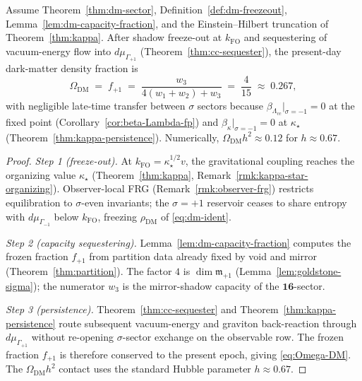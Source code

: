 \begin{theorem}
\label{thm:dm-abundance}
Assume Theorem~\ref{thm:dm-sector}, Definition~\ref{def:dm-freezeout},
Lemma~\ref{lem:dm-capacity-fraction}, and the Einstein--Hilbert truncation of
Theorem~\ref{thm:kappa}. After shadow freeze-out at $k_{\mathrm{FO}}$ and
sequestering of vacuum-energy flow into $d\mu_{\Gamma_{+1}}$
(Theorem~\ref{thm:cc-sequester}), the present-day dark-matter density fraction
is
\begin{equation}\label{eq:Omega-DM}
  \Omega_{\mathrm{DM}}
  \;=\;
  f_{+1}
  \;=\;
  \frac{w_3}{4(w_1+w_2)+w_3}
  \;=\;
  \frac{4}{15}
  \;\approx\;
  0.267,
\end{equation}
with negligible late-time transfer between $\sigma$ sectors because
$\beta_{\Lambda_{\mathrm{cc}}}|_{\sigma=-1}=0$ at the fixed point
(Corollary~\ref{cor:beta-Lambda-fp}) and $\beta_\kappa|_{\sigma=-1}=0$ at
$\kappa_\star$ (Theorem~\ref{thm:kappa-persistence}). Numerically,
$\Omega_{\mathrm{DM}}h^2\approx 0.12$ for $h\approx 0.67$.
\end{theorem}

\begin{proof}
\emph{Step 1 (freeze-out).}
At $k_{\mathrm{FO}}=\kappa_\star^{1/2}v$, the gravitational coupling reaches
the organizing value $\kappa_\star$ (Theorem~\ref{thm:kappa},
Remark~\ref{rmk:kappa-star-organizing}). Observer-local FRG
(Remark~\ref{rmk:observer-frg}) restricts equilibration to
$\sigma$-even invariants; the $\sigma=+1$ reservoir ceases to share entropy
with $d\mu_{\Gamma_{-1}}$ below $k_{\mathrm{FO}}$, freezing
$\rho_{\mathrm{DM}}$ of \eqref{eq:dm-ident}.

\emph{Step 2 (capacity sequestering).}
Lemma~\ref{lem:dm-capacity-fraction} computes the frozen fraction $f_{+1}$
from partition data already fixed by void and mirror
(Theorem~\ref{thm:partition}). The factor $4$ is $\dim\mathfrak{m}_{+1}$
(Lemma~\ref{lem:goldstone-sigma}); the numerator $w_3$ is the mirror-shadow
capacity of the $\mathbf{16}$-sector.

\emph{Step 3 (persistence).}
Theorem~\ref{thm:cc-sequester} and Theorem~\ref{thm:kappa-persistence} route
subsequent vacuum-energy and graviton back-reaction through
$d\mu_{\Gamma_{+1}}$ without re-opening $\sigma$-sector exchange on the
observable row. The frozen fraction $f_{+1}$ is therefore conserved to the
present epoch, giving \eqref{eq:Omega-DM}. The $\Omega_{\mathrm{DM}}h^2$
contact uses the standard Hubble parameter $h\approx 0.67$.
\end{proof}

